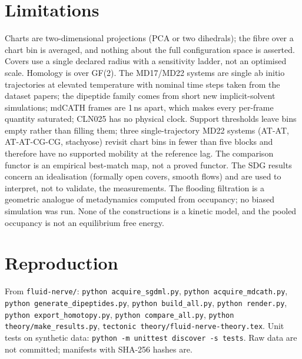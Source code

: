 \documentclass[11pt]{article}
\begin{document}
\section{Limitations}
Charts are two-dimensional projections (PCA or two dihedrals); the fibre over a chart bin is averaged, and nothing about the full configuration space is asserted. Covers use a single declared radius with a sensitivity ladder, not an optimised scale. Homology is over GF(2). The MD17/MD22 systems are single ab initio trajectories at elevated temperature with nominal time steps taken from the dataset papers; the dipeptide family comes from short new implicit-solvent simulations; mdCATH frames are 1\,ns apart, which makes every per-frame quantity saturated; CLN025 has no physical clock. Support thresholds leave bins empty rather than filling them; three single-trajectory MD22 systems (AT-AT, AT-AT-CG-CG, stachyose) revisit chart bins in fewer than five blocks and therefore have no supported mobility at the reference lag. The comparison functor is an empirical best-match map, not a proved functor. The SDG results concern an idealisation (formally open covers, smooth flows) and are used to interpret, not to validate, the measurements. The flooding filtration is a geometric analogue of metadynamics computed from occupancy; no biased simulation was run. None of the constructions is a kinetic model, and the pooled occupancy is not an equilibrium free energy.

\section{Reproduction}
From \texttt{fluid-nerve/}: \texttt{python acquire\_sgdml.py}, \texttt{python acquire\_mdcath.py}, \texttt{python generate\_dipeptides.py}, \texttt{python build\_all.py}, \texttt{python render.py}, \texttt{python export\_homotopy.py}, \texttt{python compare\_all.py}, \texttt{python theory/make\_results.py}, \texttt{tectonic theory/fluid-nerve-theory.tex}. Unit tests on synthetic data: \texttt{python -m unittest discover -s tests}. Raw data are not committed; manifests with SHA-256 hashes are.
\end{document}
